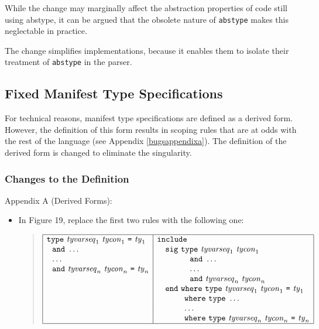\documentclass[twoside,titlepage]{article}
\begin{document}
\begin{appendix}
While the change may marginally affect the abstraction properties of code still using abstype, it can be argued that the obsolete nature of {\tt abstype} makes this neglectable in practice.

The change simplifies implementations, because it enables them to isolate their treatment of {\tt abstype} in the parser.


\subsection{Fixed Manifest Type Specifications}
\label{ext-manifest}

For technical reasons, manifest type specifications are defined as a derived form. However, the definition of this form results in scoping rules that are at odds with the rest of the language (see Appendix \ref{bugsappendixa}). The definition of the derived form is changed to eliminate the singularity.

\subsubsection*{Changes to the Definition}

Appendix A (Derived Forms):
\begin{itemize}
\item In Figure 19, replace the first two rules with the following one:
  \begin{quote}
  $\begin{array}{|l|l|}
  \hline
  {\tt{type}}~\mathit{tyvarseq}_1~\mathit{tycon}_1~\mbox{\tt=}~\mathit{ty}_1
  & {\tt{include}} \\
  ~~{\tt{and}}~\dots
  & ~~~{\tt{sig}}~{\tt{type}}~\mathit{tyvarseq}_1~\mathit{tycon}_1 \\
  ~~\dots
  & ~~~~~~~~~~~~{\tt{and}}~\dots \\
  ~~{\tt{and}}~\mathit{tyvarseq}_n~\mathit{tycon}_n~\mbox{\tt=}~\mathit{ty}_n
  & ~~~~~~~~~~~~\dots \\
  & ~~~~~~~~~~~~{\tt{and}}~\mathit{tyvarseq}_n~\mathit{tycon}_n \\
  & ~~~{\tt{end}}~{\tt{where}}~{\tt{type}}~\mathit{tyvarseq}_1~\mathit{tycon}_1~\mbox{\tt=}~\mathit{ty}_1 \\
  & ~~~~~~~~~~{\tt{where}}~{\tt{type}}~\dots \\
  & ~~~~~~~~~~\dots \\
  & ~~~~~~~~~~{\tt{where}}~{\tt{type}}~\mathit{tyvarseq}_n~\mathit{tycon}_n~\mbox{\tt=}~\mathit{ty}_n \\
  \hline
  \end{array}$
  \end{quote}
\end{itemize}


\end{appendix}
\end{document}
